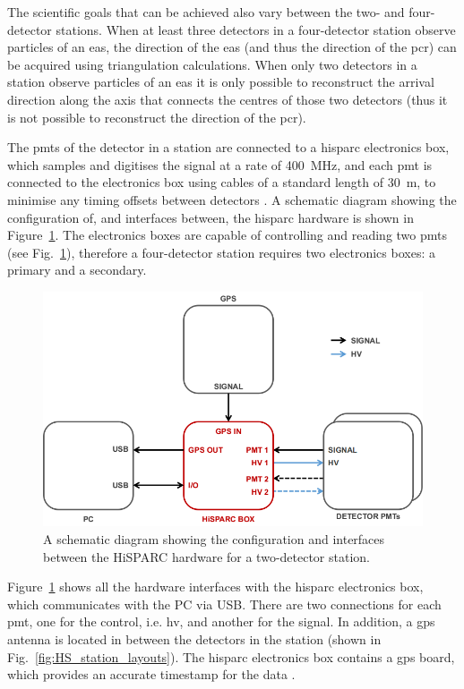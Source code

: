 The scientific goals that can be achieved also vary between the two- and four-detector stations. When at least three detectors in a four-detector station observe particles of an \gls{eas}, the direction of the \gls{eas} (and thus the direction of the \gls{pcr}) can be acquired using triangulation calculations. When only two detectors in a station observe particles of an \gls{eas} it is only possible to reconstruct the arrival direction along the axis that connects the centres of those two detectors (thus it is not possible to reconstruct the direction of the \gls{pcr}).

The \glspl{pmt} of the detector in a station are connected to a \gls{hisparc} electronics box, which samples and digitises the signal at a rate of 400~MHz, and each \gls{pmt} is connected to the electronics box using cables of a standard length of 30~m, to minimise any timing offsets between detectors \citep{fokkema_hisparc_2012, van_dam_hisparc_2020}. A schematic diagram showing the configuration of, and interfaces between, the \gls{hisparc} hardware is shown in Figure~\ref{fig:HS_hardware_config}. The electronics boxes are capable of controlling and reading two \glspl{pmt} (see Fig.~\ref{fig:HS_hardware_config}), therefore a four-detector station requires two electronics boxes: a primary and a secondary.


\begin{figure}[ht!]
	\centering
	\includegraphics[width=\columnwidth]{HS_hardware_config.png}
	\caption{A schematic diagram showing the configuration and interfaces between the HiSPARC hardware for a two-detector station.}
	\label{fig:HS_hardware_config}
\end{figure}

Figure~\ref{fig:HS_hardware_config} shows all the hardware interfaces with the \gls{hisparc} electronics box, which communicates with the PC via USB. There are two connections for each \gls{pmt}, one for the control, i.e. \gls{hv}, and another for the signal. In addition, a \gls{gps} antenna is located in between the detectors in the station (shown in Fig.~\ref{fig:HS_station_layouts}). The \gls{hisparc} electronics box contains a \gls{gps} board, which provides an accurate timestamp for the data \citep{fokkema_hisparc_2012}.



